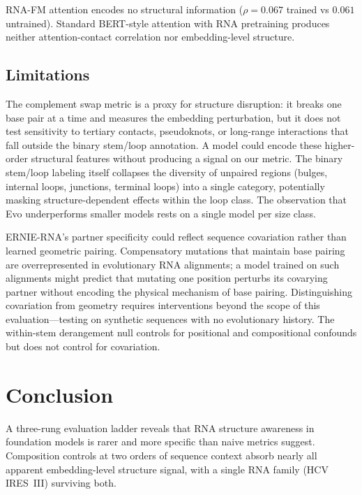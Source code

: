 \documentclass[11pt]{article}
\begin{document}
RNA-FM attention encodes no structural information ($\rho = 0.067$
trained vs $0.061$ untrained).  Standard BERT-style attention with
RNA pretraining produces neither attention-contact correlation nor
embedding-level structure.

\subsection{Limitations}
\label{sec:limitations}

The complement swap metric is a proxy for structure disruption: it
breaks one base pair at a time and measures the embedding perturbation,
but it does not test sensitivity to tertiary contacts, pseudoknots, or
long-range interactions that fall outside the binary stem/loop
annotation.  A model could encode these higher-order structural
features without producing a signal on our metric.  The binary
stem/loop labeling itself collapses the diversity of unpaired regions
(bulges, internal loops, junctions, terminal loops) into a single
category, potentially masking structure-dependent effects within the
loop class.  The observation that Evo underperforms smaller models
rests on a single model per size class.

ERNIE-RNA's partner specificity could reflect sequence covariation
rather than learned geometric pairing.  Compensatory mutations that
maintain base pairing are overrepresented in evolutionary RNA
alignments; a model trained on such alignments might predict that
mutating one position perturbs its covarying partner without encoding
the physical mechanism of base pairing.  Distinguishing covariation
from geometry requires interventions beyond the scope of this
evaluation---testing on synthetic sequences with no evolutionary
history.  The within-stem derangement null controls for positional
and compositional confounds but does not control for covariation.


\section{Conclusion}
\label{sec:conclusion}

A three-rung evaluation ladder reveals that RNA structure awareness
in foundation models is rarer and more specific than naive metrics
suggest.  Composition controls at two orders of sequence context
absorb nearly all apparent embedding-level structure signal, with a
single RNA family (HCV IRES~III) surviving both.
\end{document}
